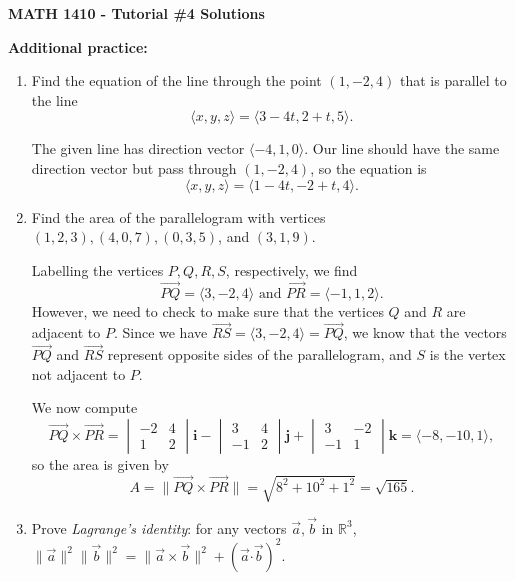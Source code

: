 \documentclass[12pt]{article}
\newcommand{\len}[1]{\lVert #1\rVert}
\renewcommand{\i}{\mathbf{i}}
\renewcommand{\j}{\mathbf{j}}
\renewcommand{\k}{\mathbf{k}}
\newcommand{\R}{\mathbb{R}}
\newcommand{\dotp}{\boldsymbol{\cdot}}
\newcommand{\bvm}{\begin{vmatrix}}
\newcommand{\evm}{\end{vmatrix}}
\begin{document}
\author{Instructor: Sean Fitzpatrick}
\thispagestyle{empty}
\begin{center}
{\bf MATH 1410 - Tutorial \#4 Solutions}
\end{center}

\textbf{Additional practice:}
\begin{enumerate}
\item Find the equation of the line through the point $(1,-2,4)$ that is parallel to the line
\[
\langle x,y,z\rangle = \langle 3-4t,2+t,5\rangle.
\]

The given line has direction vector $\langle -4,1,0\rangle$. Our line should have the same direction vector but pass through $(1,-2,4)$, so the equation is
\[
\langle x,y,z\rangle = \langle 1-4t,-2+t,4\rangle.
\]
\item Find the area of the parallelogram with vertices $(1,2,3), (4,0,7), (0,3,5)$, and $(3,1,9)$.

\medskip

Labelling the vertices $P,Q,R,S$, respectively, we find
\[
\overrightarrow{PQ}=\langle 3,-2,4\rangle \text{ and } \overrightarrow{PR}=\langle -1,1,2\rangle.
\]
However, we need to check to make sure that the vertices $Q$ and $R$ are adjacent to $P$. Since we have $\overrightarrow{RS}=\langle 3,-2,4\rangle=\overrightarrow{PQ}$, we know that the vectors $\overrightarrow{PQ}$ and $\overrightarrow{RS}$ represent opposite sides of the parallelogram, and $S$ is the vertex not adjacent to $P$.

We now compute
\[
\overrightarrow{PQ}\times \overrightarrow{PR} = \bvm -2&4\\1&2\evm\i-\bvm 3&4\\-1&2\evm\j +\bvm 3&-2\\-1&1\evm\k = \langle -8,-10,1\rangle,
\]
so the area is given by
\[
A = \len{\overrightarrow{PQ}\times \overrightarrow{PR}} = \sqrt{8^2+10^2+1^2}=\sqrt{165}.
\]
\item Prove \textit{Lagrange's identity}: for any vectors $\vec{a},\vec{b}$ in $\R^3$, $\len{\vec{a}}^2\len{\vec{b}}^2=\len{\vec{a}\times\vec{b}}^2 +(\vec{a}\dotp\vec{b})^2.$


\end{enumerate}
\end{document}
